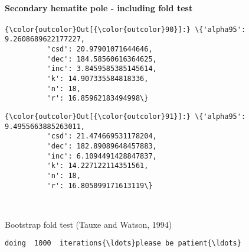 \documentclass[11pt]{article}
\begin{document}
    \paragraph{Secondary hematite pole - including fold
test}\label{secondary-hematite-pole---including-fold-test}




            \begin{Verbatim}[commandchars=\\\{\}]
{\color{outcolor}Out[{\color{outcolor}90}]:} \{'alpha95': 9.2608689622177227,
          'csd': 20.97901071644646,
          'dec': 184.58560616364625,
          'inc': 3.8459585385145614,
          'k': 14.907335584818336,
          'n': 18,
          'r': 16.85962183494998\}
\end{Verbatim}
        

            \begin{Verbatim}[commandchars=\\\{\}]
{\color{outcolor}Out[{\color{outcolor}91}]:} \{'alpha95': 9.4955663885263011,
          'csd': 21.474669531178204,
          'dec': 182.89089648457883,
          'inc': 6.1094491428847837,
          'k': 14.227122114351561,
          'n': 18,
          'r': 16.805099171613119\}
\end{Verbatim}
        

    \begin{center}
    \end{center}
    { \hspace*{\fill} \\}
    
    Bootstrap fold test (Tauxe and Watson, 1994)


    \begin{Verbatim}[commandchars=\\\{\}]
doing  1000  iterations{\ldots}please be patient{\ldots}
    \end{Verbatim}

    \begin{center}
    \end{center}
    { \hspace*{\fill} \\}
    
    \begin{center}
    \end{center}
    { \hspace*{\fill} \\}
    
\end{document}
